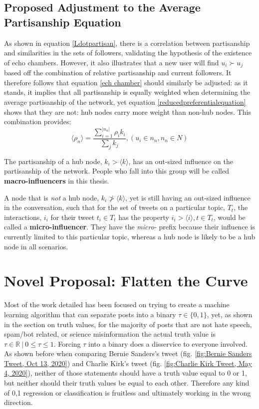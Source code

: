 \documentclass[NETN,manuscript]{stjour-new}
\begin{document}
\subsection{Proposed Adjustment to the Average Partisanship Equation}
As shown in equation \ref{Ldotpartisan}, there is a correlation between partisanship and similarities in the sets of followers, validating the hypothesis of the existence of echo chambers. However, it also illustrates that a new user will find $u_i \succ u_j$ based off the combination of relative partisanship and current followers. It therefore follows that equation \ref{ech chamber} should similarly be adjusted: as it stands, it implies that all partisanship is equally weighted when determining the average partisanship of the network, yet equation \ref{reducedpreferentialequation} shows that they are not: hub nodes carry more weight than non-hub nodes. This combination provides:
\begin{equation}
    \label{echo chamber by followers}
        \langle \rho_n \rangle = \frac{\sum_{i=1}^{|n_n|}\rho_ik_i}{\sum_{j}k_j}, (u_i \in n_n, n_n \in N)
 \end{equation}
 
 The partisanship of a hub node, $k_i > \langle k \rangle$, has an out-sized influence on the partisanship of the network. People who fall into this group will be called \textbf{macro-influencers} in this thesis.
 
 A node that is \textit{not} a hub node, $k_i \ngtr \langle k \rangle$, yet is still having an out-sized influence in the conversation, such that for the set of tweets on a particular topic, $T_t$, the interactions, $i_i$ for their tweet $t_i \in T_t$ has the property $i_i > \langle i \rangle, t \in T_t$, would be called a \textbf{micro-influencer}. They have the \textit{micro-} prefix because their influence is currently limited to this particular topic, whereas a hub node is likely to be a hub node in all scenarios.
 \section{Novel Proposal: Flatten the Curve}
 Most of the work detailed has been focused on trying to create a machine learning algorithm that can separate posts into a binary $\tau \in \{0,1\}$, yet, as shown in the section on truth values, for the majority of posts that are not hate speech, spam/bot related, or science misinformation the actual truth value is $\tau \in \mathbb{R} \ | \ 0 \leq \tau \leq 1$. Forcing $\tau$ into a binary does a disservice to everyone involved. As shown before when comparing Bernie Sanders's tweet (fig. \ref{fig:Bernie Sanders Tweet, Oct 13, 2020}) and  Charlie Kirk's tweet (fig. \ref{fig:Charlie Kirk Tweet, May 4, 2020}), neither of those statements should have a truth value equal to 0 or 1, but neither should their truth values be equal to each other. Therefore any kind of 0,1 regression or classification is fruitless and ultimately working in the wrong direction.
 
\end{document}
